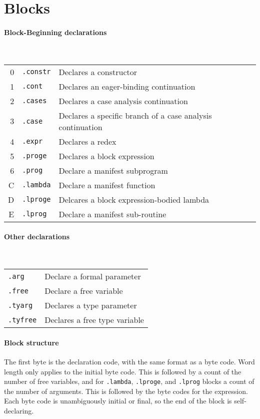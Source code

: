 \documentclass{article}
\begin{document}
\section{Blocks}

\paragraph{Block-Beginning declarations}\

\begin{tabular}{rl@{ --- }l}
  0 & \texttt{.constr} & Declares a constructor \\
  1 & \texttt{.cont} & Declares an eager-binding continuation \\
  2 & \texttt{.cases} & Declares a case analysis continuation \\
  3 & \texttt{.case} & Declares a specific branch of a case analysis continuation \\
  4 & \texttt{.expr} & Declares a redex \\
  5 & \texttt{.proge} & Declares a block expression \\
  6 & \texttt{.prog} & Declare a manifest subprogram \\
  C & \texttt{.lambda} & Declare a manifest function \\
  D & \texttt{.lproge} & Delcares a block expression-bodied lambda \\
  E & \texttt{.lprog} & Declare a manifest sub-routine \\
\end{tabular}

\paragraph{Other declarations}\

\begin{tabular}{l@{ --- }l}
  \texttt{.arg} & Declare a formal parameter \\
  \texttt{.free} & Declare a free variable \\
  \texttt{.tyarg} & Declares a type parameter \\
  \texttt{.tyfree} & Declares a free type variable \\
\end{tabular}

\paragraph{Block structure}

The first byte is the declaration code, with the same format as a byte code.
Word length only applies to the initial byte code.
This is followed by a count of the number of free variables,
and for \texttt{.lambda}, \texttt{.lproge}, and \texttt{.lprog} blocks a count of the number of arguments.
This is followed by the byte codes for the expression.
Each byte code is unambiguously initial or final, so the end of the block is self-declaring.

\end{document}
